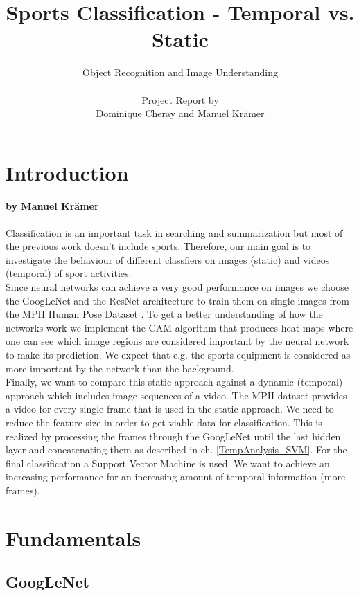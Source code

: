 \documentclass[11pt]{report}
\title{\textbf{Sports Classification - Temporal vs. Static}}
\author{Object Recognition and Image Understanding \\ \\
  Project Report by \\
  Dominique Cheray and Manuel Krämer}
\begin{document}
\maketitle

\tableofcontents
 
\chapter{Introduction}
\subsubsection{by Manuel Krämer}
Classification is an important task in searching and summarization but most of the previous work doesn't include sports. Therefore, our main goal is to investigate the behaviour of different classfiers on images (static) and videos (temporal) of sport activities. \\
Since neural networks can achieve a very good performance on images we choose
the GoogLeNet \cite{szegedy2015going} and the ResNet \cite{he2016deep}
architecture to train them on single images from the MPII Human Pose Dataset
\cite{andriluka20142d}. To get a better understanding of how the networks work
we implement the CAM algorithm \cite{zhou2016learning} that produces heat maps
where one can see which image regions are considered important by the neural
network to make its prediction. We expect that e.g. the sports equipment is considered as more important by the network than the background. \\
Finally, we want to compare this static approach against a dynamic (temporal) approach which includes image sequences of a video. The MPII dataset provides a video for every single frame that is used in the static approach. We need to reduce the feature size in order to get viable data for classification. This is realized by processing the frames through the GoogLeNet until the last hidden layer and concatenating them as described in ch. \ref{TempAnalysis_SVM}. For the final classification a Support Vector Machine is used. We want to achieve an increasing performance for an increasing amount of temporal information (more frames).

\chapter{Fundamentals}
\section{GoogLeNet}
\end{document}
